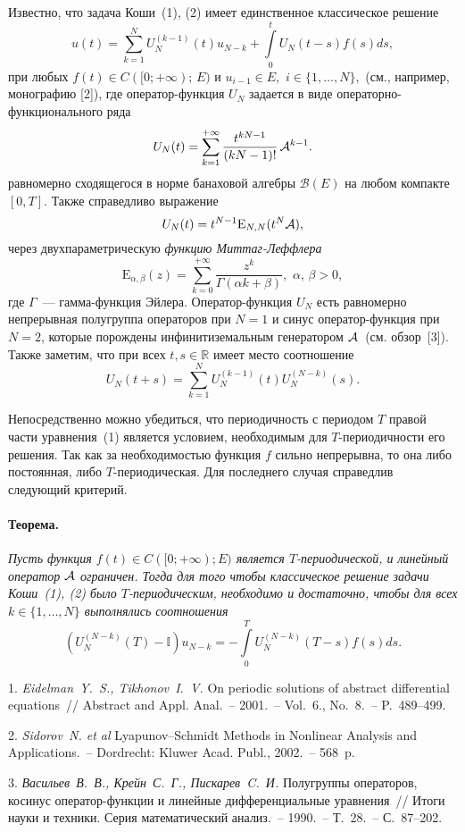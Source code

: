 \documentclass{vzmsthesis}
\begin{document}
Известно, что задача Коши~(1), (2) имеет единственное классическое решение 
$$
u(t)=\sum\limits_{k=1}^{N}U_{N}^{(k-1)}(t)u_{N-k}+\int\limits_{0}^{t}U_{N}(t-s)f(s)ds,
$$
при любых $f(t)\in C([0;+\infty);\,E)$ и $u_{i-1}\in E,\,\,i\in\lbrace 1,\ldots,N\rbrace,$ (см., например, монографию [2]), где оператор-функция $U_{N}$ задается в виде операторно-функционального ряда
$$
U_{N}(t)=\sum\limits_{k=1}^{+\infty}\frac{t^{kN-1}}{(kN-1)!}\,{\cal A}^{k-1}.
$$
равномерно сходящегося в норме банаховой алгебры ${\mathscr B}(E)$ на любом компакте $[0,T]$. Также справедливо выражение
$$
U_{N}(t)=t^{N-1}{\mathrm E}_{N,N}(t^{N}{\cal A}),
$$
через двухпараметрическую {\it функцию Миттаг-Леффлера} 
$$
{\mathrm E}_{\alpha,\beta}(z)=\sum\limits_{k=0}^{+\infty}\frac{z^{k}}{\Gamma(\alpha k+\beta)},\,\,\alpha,\,\beta>0,
$$
где $\Gamma$~--- гамма-функция Эйлера. Оператор-функция $U_{N}$ есть равномерно непрерывная полугруппа операторов при $N=1$ и синус оператор-функция при $N=2$, которые порождены инфинитиземальным генератором ${\cal A}$~(см. обзор~[3]). Также заметим, что при всех $t,s\in{\mathbb R}$ имеет место  соотношение
$$
U_{N}(t+s)=\sum\limits_{k=1}^{N}U_{N}^{(k-1)}(t)U_{N}^{(N-k)}(s).
$$

Непосредственно можно убедиться, что периодичность с периодом $T$ правой части  уравнения~(1) является условием, необходимым для $T$-периодичности его решения. Так как за необходимостью функция $f$ сильно непрерывна, то она либо постоянная, либо $T$-периодическая. Для последнего случая справедлив следующий критерий.

\paragraph{Теорема.} {\it Пусть функция $f(t)\in C([0;+\infty);E)$ является $T$-периодической, и линейный оператор ${\cal A}$ ограничен. Тогда для того чтобы классическое решение задачи Коши~(1), (2) было $T$-периодическим,  необходимо и достаточно, чтобы для всех $k\in\lbrace 1,\ldots,N\rbrace$ выполнялись соотношения
$$
(U_{N}^{(N-k)}(T)-{\mathbb I})u_{N-k}=-\int\limits_{0}^{T}U_{N}^{(N-k)}(T-s)f(s)ds.
$$}

\litlist

1. {\it Eidelman~Y.~S., Tikhonov~I.~V.} On periodic solutions of abstract differential equations~// Abstract and Appl. Anal.~– 2001.~– Vol.~6., No.~8.~– P.~489–499.

2. {\it Sidorov~N. et al} Lyapunov–Schmidt Methods in Nonlinear Analysis and Applications.~– Dordrecht: Kluwer Acad. Publ., 2002.~– 568~p.

3. {\it Васильев~В.~В., Крейн~С.~Г., Пискарев~C.~И.} Полугруппы операторов, косинус оператор-функции и линейные дифференциальные уравнения~// Итоги науки и техники. Серия математический анализ.~– 1990.~– Т.~28.~– С.~87–202.
\end{document}
